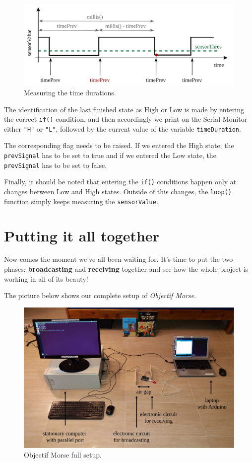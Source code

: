 \documentclass[12pt]{report}
\begin{document}
\begin{figure}[H]
\centering\includegraphics[scale=0.18]{timedurations}
\caption{Measuring the time durations.}				
\label{fig:timedur}
\end{figure}

The identification of the last finished state as High or Low is made by entering the correct \verb|if()| condition, and then accordingly we print on the Serial Monitor either \verb|"H"| or \verb|"L"|, followed by the current value of the variable \verb|timeDuration|.

The corresponding flag needs to be raised. If we entered the High state, the \verb|prevSignal| has to be set to true and if we entered the Low state, the \verb|prevSignal| has to be set to false.

Finally, it should be noted that entering the \verb|if()| conditions happen only at changes between Low and High states. Outside of this changes, the \verb|loop()| function simply keeps measuring the \verb|sensorValue|.

\chapter{Putting it all together}

Now comes the moment we've all been waiting for. It's time to put the two phases: \textbf{broadcasting} and \textbf{receiving} together and see how the whole project is working in all of its beauty!

The picture below shows our complete setup of \textit{Objectif Morse}.

\begin{figure}[H]
\centering\includegraphics[width=15cm]{full_setup}
\caption{Objectif Morse full setup.}				
\label{fig:full_setup}
\end{figure}
\end{document}
